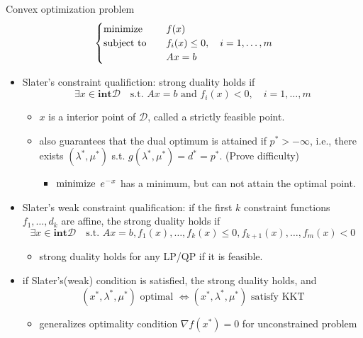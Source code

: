 \begin{remark}
    Convex optimization problem\[\begin{cases}
        \operatorname{minimize} \quad &f(x)\\
        \operatorname{subject\ to} \quad &f_i(x) \le 0, \quad i = 1, \dots, m\\
        &Ax = b
    \end{cases}\]
    \begin{itemize}
        \item Slater's constraint qualifiction: strong duality holds if \[\exists x \in \mathbf{int}\mathcal{D}\quad \text{s.t. }Ax = b \text{ and }f_i(x) < 0,\quad  i = 1, \dots, m\] \begin{itemize}
            \item $x$ is a interior point of $\mathcal{D}$, called a strictly feasible point.
            \item also guarantees that the dual optimum is attained if $p^* > -\infty$, i.e., there exists $(\lambda^*, \mu^*)$ s.t. $g(\lambda^*, \mu^*) = d^* = p^*$. (Prove difficulty)\begin{itemize}
                \item $\operatorname{minimize}\ e^{-x}$ has a minimum, but can not attain the optimal point.
            \end{itemize}
        \end{itemize}
        \item Slater's weak constraint qualification: if the first $k$ constraint functions $f_1, \dots, d_k$ are affine, the strong duality holds if \[\exists x \in \mathbf{ int } \mathcal{D}\quad \text {s.t. } A x=b, f_{1}(x), \ldots, f_{k}(x) \leq 0, f_{k+1}(x), \ldots, f_{m}(x)<0\]\begin{itemize}
            \item strong duality holds for any LP/QP if it is feasible.
        \end{itemize}
        \item if Slater's(weak) condition is satisfied, the strong duality holds, and \[(x^*, \lambda^*, \mu^*) \text{ optimal } \Longleftrightarrow (x^*, \lambda^*, \mu^*) \text{ satisfy KKT}\]\begin{itemize}
            \item generalizes optimality condition $\nabla f(x^*) = 0$ for unconstrained problem
        \end{itemize}
    \end{itemize}
\end{remark}


